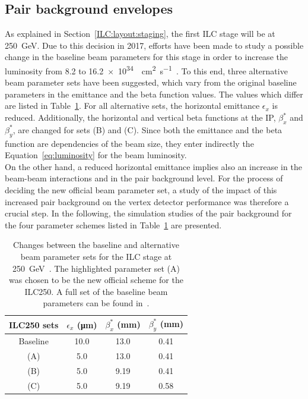 \subsection{Pair background envelopes}
\label{PairBkg:envelopes}
As explained in Section~\ref{ILC:layout:staging}, the first ILC stage will be at \SI{250}{\GeV}.
Due to this decision in 2017, efforts have been made to study a possible change in the baseline beam parameters for this stage in order to increase the luminosity from \num{8.2} to \SI{16.2e34}{\per\centi\meter\squared\per\second}~\cite{LCWS17_paper}. 
To this end, three alternative beam parameter sets have been suggested, which vary from the original baseline parameters in the emittance and the beta function values.
The values which differ are listed in Table~\ref{tab:ILC250_sets}.
For all alternative sets, the horizontal emittance $\epsilon_x$ is reduced. 
Additionally, the horizontal and vertical beta functions at the IP, $\beta^*_x$ and $\beta^*_y$, are changed for sets (B) and (C).
Since both the emittance and the beta function are dependencies of the beam size, they enter indirectly the Equation~\ref{eq:luminosity} for the beam luminosity.
\\On the other hand, a reduced horizontal emittance implies also an increase in the beam-beam interactions and in the pair background level.
For the process of deciding the new official beam parameter set, a study of the impact of this increased pair background on the \sid vertex detector performance was therefore a crucial step.
In the following, the simulation studies of the pair background for the four parameter schemes listed in Table~\ref{tab:ILC250_sets} are presented.
\begin{table}
\caption[New ILC250 beam parameters]{Changes between the baseline and alternative beam parameter sets for the ILC stage at \SI[detect-all]{250}{\GeV}~\cite{LCWS17_paper}.
The highlighted parameter set (A) was chosen to be the new official scheme for the ILC250.
A full set of the baseline beam parameters can be found in~\cite[p. 11]{TDR1}.}
\label{tab:ILC250_sets}
\centering
\begin{tabularx}{0.48\textwidth}{c|ccc}
\hline\hline
\textbf{ILC250 sets} & $\epsilon_x$ (\si{\micro\meter}) & $\beta^*_x$ (\si{\milli\meter}) & $\beta^*_y$ (\si{\milli\meter})\\
\hline
 Baseline & 10.0 & 13.0 & 0.41\\
\rowcolor{Gray} (A) & 5.0 & 13.0 & 0.41\\
 (B) & 5.0 & 9.19 & 0.41\\
 (C) & 5.0 & 9.19 & 0.58\\
\hline\hline
\end{tabularx}
\end{table}

